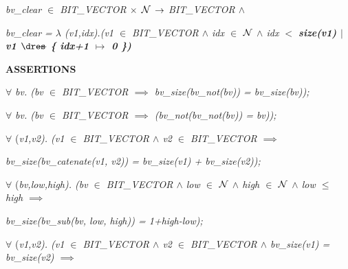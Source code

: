 \begin{sloppypar}
\hspace*{0.20in}\it bv\_clear  $\in$  \it BIT\_VECTOR  $\times$   $\mbox{${\cal N}$}$   $\rightarrow$  \it BIT\_VECTOR  $\land$ 

\hspace*{0.20in}\it bv\_clear \rm =  $\lambda$ \rm (\it v1\rm ,\it idx\rm )\rm .\rm (\it v1 $\in$  \it BIT\_VECTOR  $\land$  \it idx  $\in$   $\mbox{${\cal N}$}$   $\land$  \it idx $<$ \bf size\rm (\it v1\rm )  $\mid$  \it v1  $\lover$  \rm \{ \it idx\rm +\rm 1  $\mapsto$  \rm 0 \rm \}\rm )

\vspace*{4mm}
\bf ASSERTIONS

\hspace*{0.20in} $\forall$  \it bv\rm . \rm (\it bv  $\in$  \it BIT\_VECTOR  $\implies$  \it bv\_size\rm (\it bv\_not\rm (\it bv\rm )\rm ) \rm = \it bv\_size\rm (\it bv\rm )\rm )\rm ;

\hspace*{0.20in} $\forall$  \it bv\rm . \rm (\it bv  $\in$  \it BIT\_VECTOR  $\implies$  \rm (\it bv\_not\rm (\it bv\_not\rm (\it bv\rm )\rm ) \rm = \it bv\rm )\rm )\rm ;

\vspace*{4mm}
\hspace*{0.20in} $\forall$  \rm (\it v1\rm ,\it v2\rm )\rm . \rm (\it v1  $\in$  \it BIT\_VECTOR  $\land$  \it v2  $\in$  \it BIT\_VECTOR  $\implies$  

\hspace*{0.60in}\it bv\_size\rm (\it bv\_catenate\rm (\it v1\rm , \it v2\rm )\rm ) \rm = \it bv\_size\rm (\it v1\rm ) \rm + \it bv\_size\rm (\it v2\rm )\rm )\rm ;

\vspace*{4mm}
\hspace*{0.20in} $\forall$  \rm (\it bv\rm ,\it low\rm ,\it high\rm )\rm . \rm (\it bv  $\in$  \it BIT\_VECTOR  $\land$  \it low  $\in$   $\mbox{${\cal N}$}$   $\land$  \it high  $\in$   $\mbox{${\cal N}$}$   $\land$  \it low  $\leq$  \it high  $\implies$  

\hspace*{0.60in}\it bv\_size\rm (\it bv\_sub\rm (\it bv\rm , \it low\rm , \it high\rm )\rm ) \rm = \rm 1\rm +\it high\rm -\it low\rm )\rm ;

\vspace*{4mm}
\hspace*{0.20in} $\forall$  \rm (\it v1\rm ,\it v2\rm )\rm . \rm (\it v1  $\in$  \it BIT\_VECTOR  $\land$  \it v2  $\in$  \it BIT\_VECTOR  $\land$  \it bv\_size\rm (\it v1\rm ) \rm = \it bv\_size\rm (\it v2\rm )  $\implies$  


\end{sloppypar}
